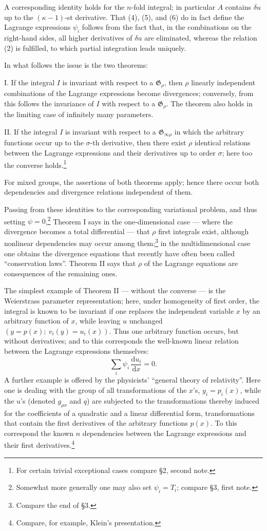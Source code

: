 \documentclass[11pt]{article}
\providecommand{\dd}{\mathrm d}
\providecommand{\G}{\mathfrak G}
\providecommand{\dd}{\mathrm d}
\begin{document}
A corresponding identity holds for the \(n\)-fold integral; in particular \(A\) contains \(\delta u\) up to the \((\kappa-1)\)-st derivative. That (4), (5), and (6) do in fact define the Lagrange expressions \(\psi_i\) follows from the fact that, in the combinations on the right-hand sides, all higher derivatives of \(\delta u\) are eliminated, whereas the relation (2) is fulfilled, to which partial integration leads uniquely.

In what follows the issue is the two theorems:

I. If the integral \(I\) is invariant with respect to a \(\G_\rho\), then \(\rho\) linearly independent combinations of the Lagrange expressions become divergences; conversely, from this follows the invariance of \(I\) with respect to a \(\G_\rho\). The theorem also holds in the limiting case of infinitely many parameters.

II. If the integral \(I\) is invariant with respect to a \(\G_{\infty\rho}\) in which the arbitrary functions occur up to the \(\sigma\)-th derivative, then there exist \(\rho\) identical relations between the Lagrange expressions and their derivatives up to order \(\sigma\); here too the converse holds.\footnote{For certain trivial exceptional cases compare \S{}2, second note.}

For mixed groups, the assertions of both theorems apply; hence there occur both dependencies and divergence relations independent of them.

Passing from these identities to the corresponding variational problem, and thus setting \(\psi=0\),\footnote{Somewhat more generally one may also set \(\psi_i=T_i\); compare \S{}3, first note.} Theorem I says in the one-dimensional case --- where the divergence becomes a total differential --- that \(\rho\) first integrals exist, although nonlinear dependencies may occur among them;\footnote{Compare the end of \S{}3.} in the multidimensional case one obtains the divergence equations that recently have often been called ``conservation laws''. Theorem II says that \(\rho\) of the Lagrange equations are consequences of the remaining ones.

The simplest example of Theorem II --- without the converse --- is the Weierstrass parameter representation; here, under homogeneity of first order, the integral is known to be invariant if one replaces the independent variable \(x\) by an arbitrary function of \(x\), while leaving \(u\) unchanged \((y=p(x);\ v_i(y)=u_i(x))\). Thus one arbitrary function occurs, but without derivatives; and to this corresponds the well-known linear relation between the Lagrange expressions themselves:
\[
\sum_i \psi_i\,\frac{\dd u_i}{\dd x}=0.
\]
A further example is offered by the physicists' ``general theory of relativity''. Here one is dealing with the group of all transformations of the \(x\)'s, \(y_i=p_i(x)\), while the \(u\)'s (denoted \(g_{\mu\nu}\) and \(q\)) are subjected to the transformations thereby induced for the coefficients of a quadratic and a linear differential form, transformations that contain the first derivatives of the arbitrary functions \(p(x)\). To this correspond the known \(n\) dependencies between the Lagrange expressions and their first derivatives.\footnote{Compare, for example, Klein's presentation.}
\end{document}
